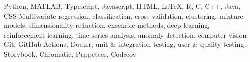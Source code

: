 \begin{rubric}{}
%
    Python, MATLAB, Typescript, Javascript, HTML, LaTeX, R, C, C++, Java, CSS
%
    Multivariate regression, classification, cross-validation, clustering, mixture models,
dimensionality reduction, ensemble methods, deep learning, reinforcement learning, time series analysis, anomaly detection, computer vision
%
\entry*[DevOps]
    Git, GitHub Actions, Docker, unit \& integration testing, user \& quality testing, Storybook, Chromatic, Puppeteer, Codecov
%
\end{rubric}
